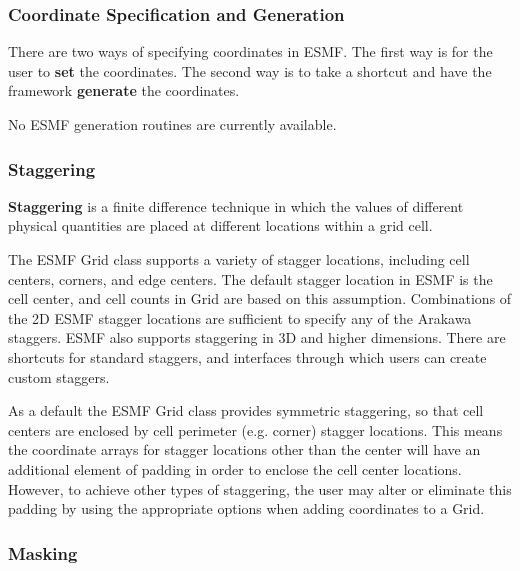 \subsubsection{Coordinate Specification and Generation}

There are two ways of specifying coordinates in ESMF.  The
first way is for the user to {\bf set} the coordinates.  The second 
way is to take a shortcut and have the framework {\bf generate}
the coordinates.  

No ESMF generation routines are currently available.


\subsubsection{Staggering}

{\bf Staggering} is a finite difference technique in which the values 
of different physical quantities are placed at different locations
within a grid cell. 

The ESMF Grid class supports a variety of stagger locations, including
cell centers, corners, and edge centers. The default stagger location in 
ESMF is the cell center, and cell counts in Grid are based on this assumption.
Combinations of the 2D ESMF stagger locations are sufficient to specify any of the
Arakawa staggers.  ESMF also supports staggering in 3D and higher dimensions.
There are shortcuts for standard staggers, and interfaces through which users 
can create custom staggers.  

As a default the ESMF Grid class provides symmetric staggering, so
that cell centers are enclosed by cell perimeter (e.g. corner) 
stagger locations. This means the coordinate arrays for stagger
locations other than the center will have an additional element of 
padding in order to enclose the cell center locations.
However, to achieve other types of staggering, the user may alter 
or eliminate this padding by using the appropriate options when adding
coordinates to a Grid. 
 

\subsubsection{Masking}
\label{sec:usage:items}

